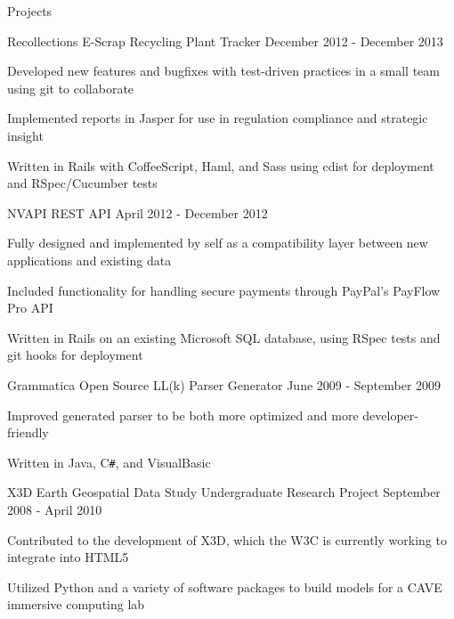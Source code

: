 \documentclass{resume}
\begin{document}
	\begin{section}{Projects}
		\begin{project}{Recollections}
		               {E-Scrap Recycling Plant Tracker}
		               {December 2012 - December 2013}
			\item Developed new features and bugfixes with test-driven practices in a
			      small team using git to collaborate
			\item Implemented reports in Jasper for use in regulation compliance and
			      strategic insight
			\item Written in Rails with CoffeeScript, Haml, and Sass using cdist for
			      deployment and RSpec/Cucumber tests
		\end{project}

		\begin{project}{NVAPI}
		               {REST API}
		               {April 2012 - December 2012}
			\item Fully designed and implemented by self as a compatibility layer
			      between new applications and existing data
			\item Included functionality for handling secure payments through
			      PayPal's PayFlow Pro API
			\item Written in Rails on an existing Microsoft SQL database, using RSpec
			      tests and git hooks for deployment
		\end{project}

		\begin{project}{Grammatica}
		               {Open Source LL(k) Parser Generator}
		               {June 2009 - September 2009}
			\item Improved generated parser to be both more optimized and more
			      developer-friendly
			\item Written in Java, C\texttt{\#}, and VisualBasic
		\end{project}

		\begin{project}{X3D Earth Geospatial Data Study}
		               {Undergraduate Research Project}
		               {September 2008 - April 2010}
			\item Contributed to the development of X3D, which the W3C is currently
			      working to integrate into HTML5
			\item Utilized Python and a variety of software packages to build models
			      for a CAVE immersive computing lab
		\end{project}
	\end{section}
\end{document}
